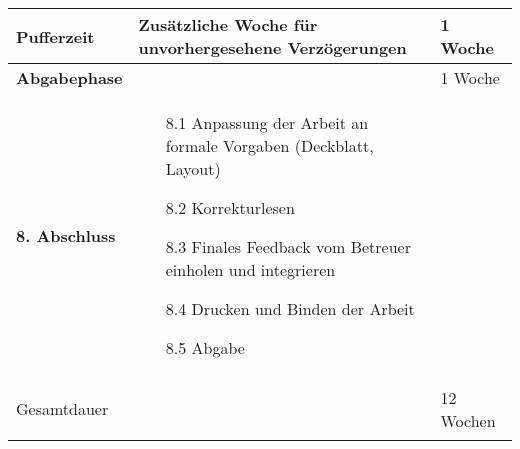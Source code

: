 \documentclass{article}
\begin{document}
\begin{center}
\begin{longtable}{>{\bfseries}p{} p{} p{}}
    Pufferzeit & Zusätzliche Woche für unvorhergesehene Verzögerungen & 1 Woche \\ \hline
    
    Abgabephase & & 1 Woche \\ 
    8. Abschluss & 
    \begin{itemize}
        \item[8.1] Anpassung der Arbeit an formale Vorgaben (Deckblatt, Layout)
        \item[8.2] Korrekturlesen
        \item[8.3] Finales Feedback vom Betreuer einholen und integrieren
        \item[8.4] Drucken und Binden der Arbeit
        \item[8.5] Abgabe
    \end{itemize} & \\ \hline
    
    Gesamtdauer & & 12 Wochen \\ \hline
    \end{longtable}
\end{center}
\end{document}
